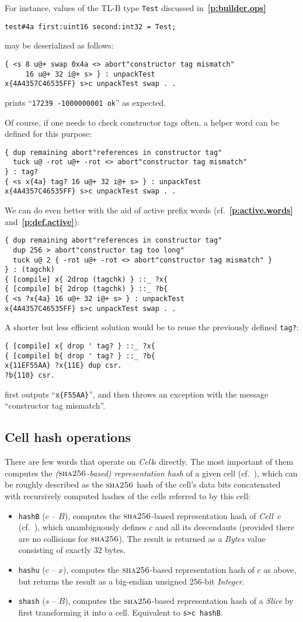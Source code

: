 \documentclass[12pt,oneside]{article}
\def\refpoint#1{{\rm\textbf{\ref{#1}}}}
\let\ptref=\refpoint
\def\mysubsection#1{\subsection{#1}\fancyhead[C]{\small{\textsc{\textrm{\thesubsection.} #1}}}}
\def\opsc#1{\operatorname{\textsc{#1}}}
\def\Sha{\opsc{sha256}}
\begin{document}
For instance, values of the TL-B type {\tt Test} discussed in~\ptref{p:builder.ops}
\begin{verbatim}
test#4a first:uint16 second:int32 = Test;
\end{verbatim}
may be deserialized as follows:
\begin{verbatim}
{ <s 8 u@+ swap 0x4a <> abort"constructor tag mismatch"
     16 u@+ 32 i@+ s> } : unpackTest
x{4A4357C46535FF} s>c unpackTest swap . .
\end{verbatim}
prints ``{\tt 17239 -1000000001 ok}'' as expected.

Of course, if one needs to check constructor tags often, a helper word can be defined for this purpose:
\begin{verbatim}
{ dup remaining abort"references in constructor tag"
  tuck u@ -rot u@+ -rot <> abort"constructor tag mismatch"
} : tag?
{ <s x{4a} tag? 16 u@+ 32 i@+ s> } : unpackTest
x{4A4357C46535FF} s>c unpackTest swap . .
\end{verbatim}
We can do even better with the aid of active prefix words (cf.~\ptref{p:active.words} and~\ptref{p:def.active}):
\begin{verbatim}
{ dup remaining abort"references in constructor tag"
  dup 256 > abort"constructor tag too long"
  tuck u@ 2 { -rot u@+ -rot <> abort"constructor tag mismatch" }
} : (tagchk)
{ [compile] x{ 2drop (tagchk) } ::_ ?x{
{ [compile] b{ 2drop (tagchk) } ::_ ?b{
{ <s ?x{4a} 16 u@+ 32 i@+ s> } : unpackTest
x{4A4357C46535FF} s>c unpackTest swap . .
\end{verbatim}
A shorter but less efficient solution would be to reuse the previously defined {\tt tag?}:
\begin{verbatim}
{ [compile] x{ drop ' tag? } ::_ ?x{
{ [compile] b{ drop ' tag? } ::_ ?b{
x{11EF55AA} ?x{11E} dup csr.
?b{110} csr.
\end{verbatim}
first outputs ``{\tt x\{F55AA\}}'', and then throws an exception with the message ``constructor tag mismatch''.

\mysubsection{Cell hash operations}\label{p:hash.ops}
There are few words that operate on {\em Cell\/}s directly. The most important of them computes the {\em ($\Sha$-based) representation hash\/} of a given cell (cf.~\cite[3.1]{TVM}), which can be roughly described as the $\Sha$ hash of the cell's data bits concatenated with recursively computed hashes of the cells referred to by this cell:
\begin{itemize}
\item {\tt hashB} ($c$ -- $B$), computes the $\Sha$-based representation hash of {\em Cell\/}~$c$ (cf.~\cite[3.1]{TVM}), which unambiguously defines $c$ and all its descendants (provided there are no collisions for $\Sha$). The result is returned as a {\em Bytes\/} value consisting of exactly 32 bytes.
\item {\tt hashu} ($c$ -- $x$), computes the $\Sha$-based representation hash of $c$ as above, but returns the result as a big-endian unsigned 256-bit {\em Integer}.
\item {\tt shash} ($s$ -- $B$), computes the $\Sha$-based representation hash of a {\em Slice\/} by first transforming it into a cell. Equivalent to {\tt s>c hashB}.
\end{itemize}
\end{document}
